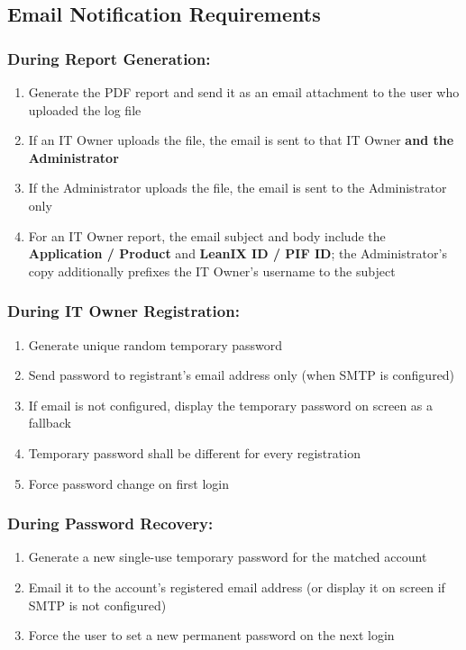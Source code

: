 \documentclass[12pt,a4paper]{article}
\begin{document}
\subsection{Email Notification Requirements}

\subsubsection{During Report Generation:}
\begin{enumerate}
    \item Generate the PDF report and send it as an email attachment to the user who uploaded the log file
    \item If an IT Owner uploads the file, the email is sent to that IT Owner \textbf{and the Administrator}
    \item If the Administrator uploads the file, the email is sent to the Administrator only
    \item For an IT Owner report, the email subject and body include the \textbf{Application / Product} and \textbf{LeanIX ID / PIF ID}; the Administrator's copy additionally prefixes the IT Owner's username to the subject
\end{enumerate}

\subsubsection{During IT Owner Registration:}
\begin{enumerate}
    \item Generate unique random temporary password
    \item Send password to registrant's email address only (when SMTP is configured)
    \item If email is not configured, display the temporary password on screen as a fallback
    \item Temporary password shall be different for every registration
    \item Force password change on first login
\end{enumerate}

\subsubsection{During Password Recovery:}
\begin{enumerate}
    \item Generate a new single-use temporary password for the matched account
    \item Email it to the account's registered email address (or display it on screen if SMTP is not configured)
    \item Force the user to set a new permanent password on the next login
\end{enumerate}
\end{document}
